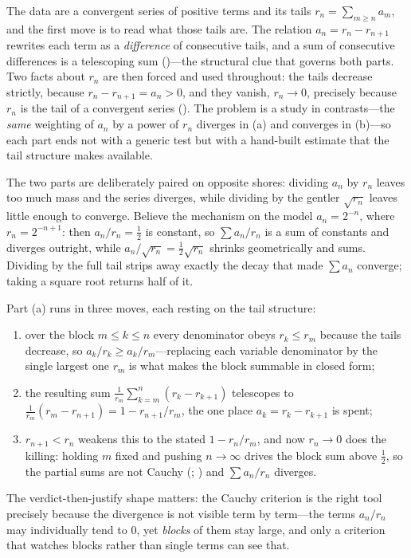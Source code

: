 \documentclass[main.tex]{subfiles}
\begin{document}
\begin{Reflection}
The data are a convergent series of positive terms and its tails $r_n=\sum_{m\ge n}a_m$, and the first
move is to read what those tails are. The relation $a_n=r_n-r_{n+1}$ rewrites each term as a
\emph{difference} of consecutive tails, and a sum of consecutive differences is a telescoping sum
()---the structural clue that governs both parts. Two facts about $r_n$ are then forced
and used throughout: the tails decrease strictly, because $r_n-r_{n+1}=a_n>0$, and they vanish,
$r_n\to 0$, precisely because $r_n$ is the tail of a convergent series (). The problem is
a study in contrasts---the \emph{same} weighting of $a_n$ by a power of $r_n$ diverges in (a) and
converges in (b)---so each part ends not with a generic test but with a hand-built estimate that the
tail structure makes available.

The two parts are deliberately paired on opposite shores: dividing $a_n$ by $r_n$ leaves too much mass
and the series diverges, while dividing by the gentler $\sqrt{r_n}$ leaves little enough to converge.
Believe the mechanism on the model $a_n=2^{-n}$, where $r_n=2^{-n+1}$: then $a_n/r_n=\tfrac12$ is
constant, so $\sum a_n/r_n$ is a sum of constants and diverges outright, while
$a_n/\sqrt{r_n}=\tfrac12\sqrt{r_n}$ shrinks geometrically and sums. Dividing by the full tail
strips away exactly the decay that made $\sum a_n$ converge; taking a square root returns half of it.

Part (a) runs in three moves, each resting on the tail structure:
\begin{enumerate}[leftmargin=1.7em,itemsep=3pt,topsep=2pt,label=\textnormal{(\arabic*)}]
  \item over the block $m\le k\le n$ every denominator obeys $r_k\le r_m$ because the tails decrease, so
        $a_k/r_k\ge a_k/r_m$---replacing each variable denominator by the single largest one $r_m$ is
        what makes the block summable in closed form;
  \item the resulting sum $\tfrac1{r_m}\sum_{k=m}^{n}(r_k-r_{k+1})$ telescopes to
        $\tfrac1{r_m}(r_m-r_{n+1})=1-r_{n+1}/r_m$, the one place $a_k=r_k-r_{k+1}$ is spent;
  \item $r_{n+1}<r_n$ weakens this to the stated $1-r_n/r_m$, and now $r_n\to 0$ does the killing:
        holding $m$ fixed and pushing $n\to\infty$ drives the block sum above $\tfrac12$, so the
        partial sums are not Cauchy (; ) and $\sum a_n/r_n$ diverges.
\end{enumerate}
The verdict-then-justify shape matters: the Cauchy criterion is the right tool precisely because the
divergence is not visible term by term---the terms $a_n/r_n$ may individually tend to $0$, yet
\emph{blocks} of them stay large, and only a criterion that watches blocks rather than single terms can
see that.


\end{Reflection}
\end{document}
